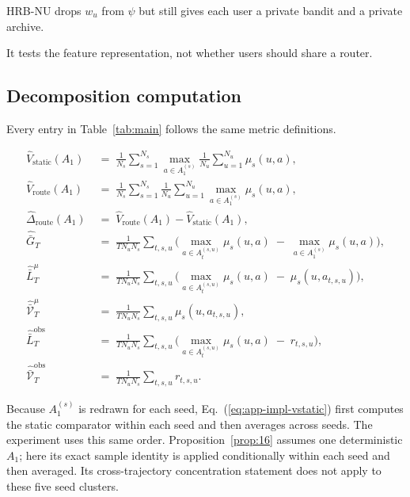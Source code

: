 \documentclass{article} %
\renewcommand{\eqref}[1]{\textup{(\ref{#1})}}
\begin{document}
HRB-NU drops $w_u$ from $\psi$ but still gives each user a private bandit and a private archive.

It tests the feature representation, not whether users should share a router.

\subsection{Decomposition computation}

\label{app:impl-decomp}

Every entry in Table~\ref{tab:main} follows the same metric definitions.

\begin{align}
\label{eq:app-impl-vstatic}
\widehat V_{\mathrm{static}}(A_1) &\;=\; \frac{1}{N_s}\sum_{s=1}^{N_s}
\max_{a \in A_1^{(s)}}\frac{1}{N_u}\sum_{u=1}^{N_u}\mu_s(u,a),\\
\label{eq:app-impl-vroute}
\widehat V_{\mathrm{route}}(A_1) &\;=\; \frac{1}{N_s}\sum_{s=1}^{N_s}
\frac{1}{N_u}\sum_{u=1}^{N_u}\max_{a \in A_1^{(s)}}\mu_s(u,a),\\
\label{eq:app-impl-dhet}
\widehat\Delta_{\mathrm{route}}(A_1) &\;=\; \widehat V_{\mathrm{route}}(A_1) - \widehat V_{\mathrm{static}}(A_1),\\
\label{eq:app-impl-Gt}
\widehat{\bar G}_T &\;=\; \frac{1}{T N_u N_s}\sum_{t,s,u}\!\Big(\max_{a \in A_t^{(s,u)}}\mu_s(u, a) \;-\; \max_{a \in A_1^{(s)}}\mu_s(u, a)\Big),\\
\label{eq:app-impl-Lt-mean}
\widehat{\bar L}_T^\mu &\;=\; \frac{1}{T N_u N_s}\sum_{t,s,u}\!\Big(\max_{a \in A_t^{(s,u)}}\mu_s(u, a) \;-\; \mu_s(u,a_{t,s,u})\Big),\\
\label{eq:app-impl-V-mean}
\widehat{\bar{\mathcal V}}_T^\mu &\;=\; \frac{1}{T N_u N_s}\sum_{t,s,u}\mu_s(u,a_{t,s,u}),\\
\label{eq:app-impl-Lt}
\widehat{\bar L}_T^{\mathrm{obs}} &\;=\; \frac{1}{T N_u N_s}\sum_{t,s,u}\!\Big(\max_{a \in A_t^{(s,u)}}\mu_s(u, a) \;-\; r_{t,s,u}\Big),\\
\label{eq:app-impl-V}
\widehat{\bar{\mathcal V}}_T^{\mathrm{obs}} &\;=\; \frac{1}{T N_u N_s}\sum_{t,s,u} r_{t,s,u}.
\end{align}

Because \(A_1^{(s)}\) is redrawn for each seed, Eq.~\eqref{eq:app-impl-vstatic}
first computes the static comparator within each seed and then averages across
seeds. The experiment uses this same order. Proposition~\ref{prop:16}
assumes one deterministic \(A_1\); here its exact sample identity is applied
conditionally within each seed and then averaged. Its cross-trajectory
concentration statement does not apply to these five seed clusters.
\end{document}
